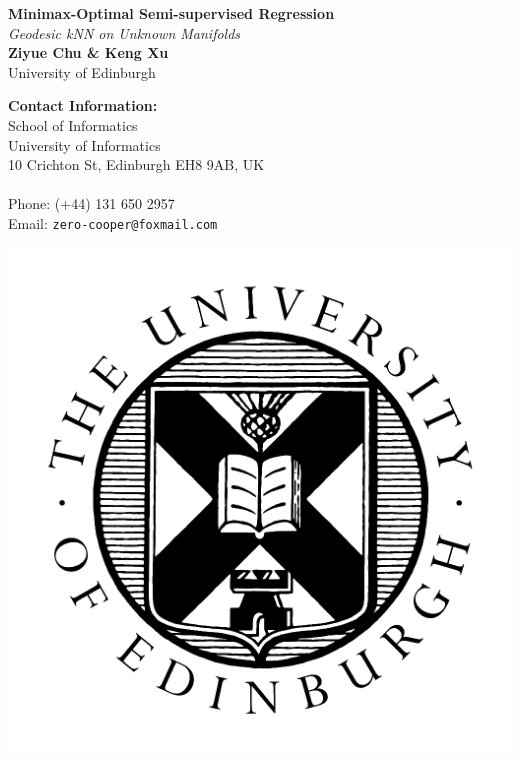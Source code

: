 \documentclass[a0,landscape]{a0poster}
\begin{document}


\begin{minipage}[b]{0.55\linewidth}
\veryHuge \color{NavyBlue} \textbf{Minimax-Optimal Semi-supervised Regression} \color{Black}\\ %
\Huge\textit{Geodesic kNN on Unknown Manifolds}\\[1cm] %
\huge \textbf{Ziyue Chu \& Keng Xu}\\ %
\huge University of Edinburgh\\ %
\end{minipage}
%
\begin{minipage}[b]{0.25\linewidth}
\color{DarkSlateGray}\Large \textbf{Contact Information:}\\
School of Informatics\\ %
University of Informatics\\
10 Crichton St, Edinburgh EH8 9AB, UK\\\\
Phone: (+44) 131 650 2957\\ %
Email: \texttt{zero-cooper@foxmail.com}\\ %
\end{minipage}
%
\begin{minipage}[b]{0.19\linewidth}
\includegraphics[width=15cm]{logo.png} %
\end{minipage}
\end{document}
